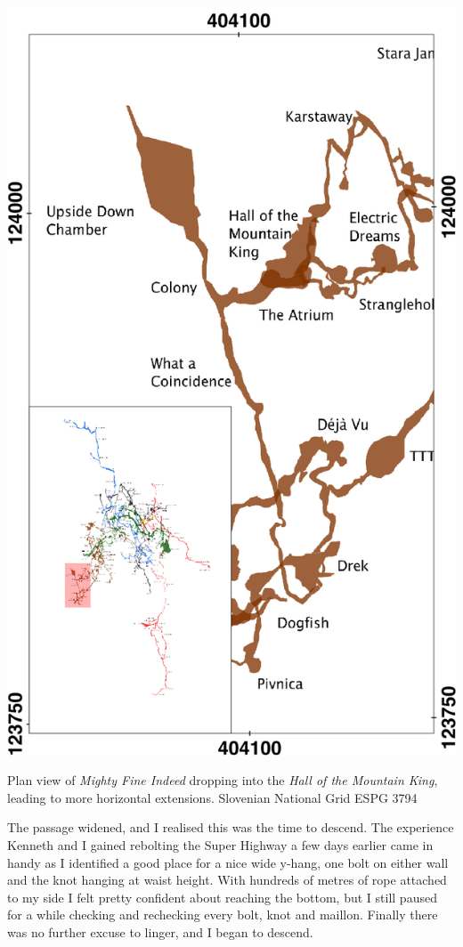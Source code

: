 \begin{marginfigure}
\checkoddpage \ifoddpage \forcerectofloat \else \forceversofloat \fi
\centering
 \includegraphics[width=\linewidth]{images/2016/jack-middle-2016/mountain_king_inset}
 \caption{Plan view of \emph{Mighty Fine Indeed} dropping into the \emph{Hall of the Mountain King}, leading to more horizontal extensions. Slovenian National Grid ESPG 3794}
 \label{Mountain King inset}
\end{marginfigure}
 
The passage widened, and I realised this was the time to descend. The experience Kenneth and I gained rebolting the Super Highway a few days earlier came in handy as I identified a good place for a nice wide y-hang, one bolt on either wall and the knot hanging at waist height. With hundreds of metres of rope attached to my side I felt pretty confident about reaching the bottom, but I still paused for a while checking and rechecking every bolt, knot and maillon. Finally there was no further excuse to linger, and I began to descend.
 
